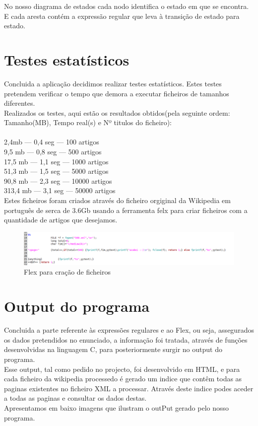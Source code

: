 \documentclass[a4paper,11pt,openright,openbib]{report}
\begin{document}
No nosso diagrama de estados cada nodo identifica o estado em que se encontra. E cada aresta contém a expressão regular que leva à transição de estado para estado.


\newpage
\section{Testes estatísticos}

Concluida a aplicação decidimos realizar testes estatísticos. Estes testes pretendem verificar o tempo que demora a executar ficheiros de tamanhos diferentes.\\
Realizados os testes, aqui estão os resultados obtidos(pela seguinte ordem: Tamanho(MB), Tempo real(s) e Nº titulos do ficheiro):
\\
\\
2,4mb ---          0,4 seg   ---          100 artigos\\
9,5 mb      ---     0,8  seg       ---    500 artigos\\
17,5 mb       ---    1,1  seg   ---        1000 artigos\\
51,3 mb       ---      1,5  seg      ---   5000 artigos\\
90,8 mb       ---        2,3 seg  ---     10000 artigos\\
313,4 mb       ---        3,1 seg    ---  50000 artigos\\

Estes ficheiros foram criados através do ficheiro orgiginal da Wikipedia em português de serca de 3.6Gb usando a ferramenta felx para criar ficheiros com a quantidade de artigos que desejamos.\\


\begin{figure}[!htb]
    \centering
    \includegraphics[scale=0.4]{imagens/files.png}
   \caption{Flex para cração de ficheiros}
\end{figure}

\newpage
\section{Output do programa}

Concluida a parte referente às expressões regulares e ao Flex, ou seja, assegurados os dados pretendidos no enunciado, a informação foi tratada, através de funções desenvolvidas na linguagem C, para posteriormente surgir no output do programa.\\
Esse output, tal como pedido no projecto, foi desenvolvido em HTML, e para cada ficheiro da wikipedia processedo é gerado um indice que contêm todas as paginas existentes no ficheiro XML a processar. Através deste indice podes aceder a todas as paginas e consultar os dados destas.\\
Apresentamos em baixo imagens que ilustram o outPut gerado pelo nosso programa.\\
\end{document}

